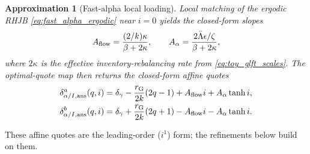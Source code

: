 \documentclass[11pt,a4paper]{article}
\theoremstyle{plain}
\newtheorem{approximation}[proposition]{Approximation}
\theoremstyle{definition}
\begin{document}
\begin{approximation}[Fast-alpha local loading]
\label{prop:fast_alpha_loading}
Local matching of the ergodic RHJB \eqref{eq:fast_alpha_ergodic} near \(i=0\) yields the closed-form slopes
\begin{equation}
A_{\rm flow}=\frac{(2/k)\kappa}{\beta+2\kappa},
\qquad
A_\alpha=\frac{2\bar\Lambda\epsilon/\zeta}{\beta+2\kappa},
\label{eq:fast_alpha_closed_h}
\end{equation}
where \(2\kappa\) is the effective inventory-rebalancing rate from \eqref{eq:toy_glft_scales}.  The optimal-quote map then returns the closed-form affine quotes
\begin{align}
\delta_{\alpha/I,\mathrm{ans}}^a(q,i)
&=\delta_\gamma-\frac{r_{\rm G}}{2k}(2q-1)+A_{\rm flow}i+A_\alpha\tanh i,
\notag\\
\delta_{\alpha/I,\mathrm{ans}}^b(q,i)
&=\delta_\gamma+\frac{r_{\rm G}}{2k}(2q+1)-A_{\rm flow}i-A_\alpha\tanh i.
\label{eq:fast_alpha_ansatz_quotes_qY}
\end{align}
\end{approximation}

These affine quotes are the leading-order (\(i^1\)) form; the refinements below build on them.
\end{document}
